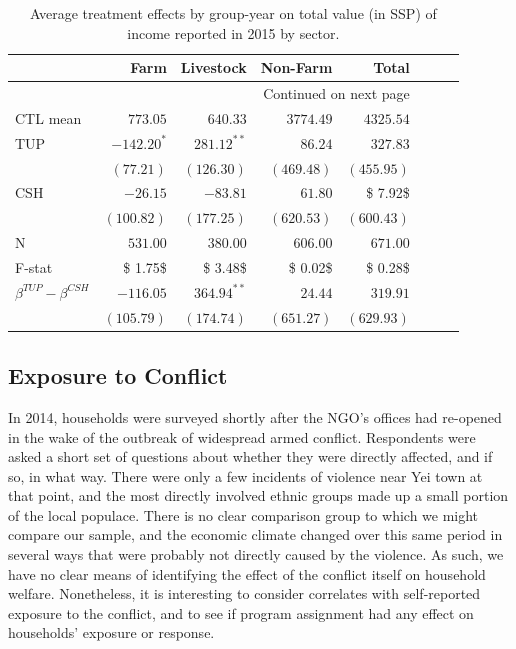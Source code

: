 \documentclass[12pt,article]{article}
\begin{document}
\begin{longtable}{lrrrrrrr}
\caption{\label{tab:Income}Average treatment effects by group-year on total value (in SSP) of income reported in 2015 by sector.}
\\
\hline
 & Farm & Livestock & Non-Farm & Total\\
\hline
\endhead
\hline\multicolumn{5}{r}{Continued on next page} \\
\endfoot
\endlastfoot
CTL mean & $773.05$ & $640.33$ & $3774.49$ & $4325.54$\\
\hline
TUP & $-142.20^{*}$ & $281.12^{**}$ & $86.24$ & $327.83$\\
 & $(77.21)$ & $(126.30)$ & $(469.48)$ & $(455.95)$\\
CSH & $-26.15$ & $-83.81$ & $61.80$ & \$ 7.92\$\\
 & $(100.82)$ & $(177.25)$ & $(620.53)$ & $(600.43)$\\
\hline
N & $531.00$ & $380.00$ & $606.00$ & $671.00$\\
F-stat & \$ 1.75\$ & \$ 3.48\$ & \$ 0.02\$ & \$ 0.28\$\\
\hline
$\beta^{TUP}-\beta^{CSH}$ & $-116.05$ & $364.94^{**}$ & $24.44$ & $319.91$\\
 & $(105.79)$ & $(174.74)$ & $(651.27)$ & $(629.93)$\\
\hline
\end{longtable}

\subsection{Exposure to Conflict}
\label{sec-3-6}

In 2014, households were surveyed shortly after the NGO's offices had re-opened in
the wake of the outbreak of widespread armed conflict. Respondents were asked a short
set of questions about whether they were directly affected, and if so, in what way.
There were only a few incidents of violence near Yei town at that point, and the most
directly involved ethnic groups made up a small portion of the local populace. There
is no clear comparison group to which we might compare our sample, and the economic
climate changed over this same period in several ways that were probably not directly
caused by the violence. As such, we have no clear means of identifying the effect of
the conflict itself on household welfare. Nonetheless, it is interesting to consider
correlates with self-reported exposure to the conflict, and to see if program
assignment had any effect on households' exposure or response.
\end{document}
